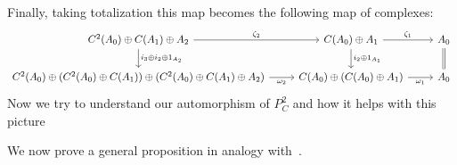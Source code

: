 Finally, taking totalization this map becomes the following map of complexes:
\[\begin{tikzcd}
	{C^2(A_0)\oplus C(A_1)\oplus A_2} & {C(A_0)\oplus A_1} & {A_0} \\
	{C^2(A_0)\oplus (C^2(A_0)\oplus C(A_1))\oplus (C^2(A_0)\oplus C(A_1)\oplus A_2)} & {C(A_0)\oplus (C(A_0)\oplus A_1)} & {A_0}
	\arrow[Rightarrow, no head, from=1-3, to=2-3]
	\arrow["{\zeta_1}", from=1-2, to=1-3]
	\arrow["{\omega_1}"', from=2-2, to=2-3]
	\arrow["{i_2\oplus 1_{A_1}}", from=1-2, to=2-2]
	\arrow["{\omega_2}"', from=2-1, to=2-2]
	\arrow["{\zeta_2}", from=1-1, to=1-2]
	\arrow["{i_3\oplus i_2\oplus 1_{A_2}}", from=1-1, to=2-1]
\end{tikzcd}\]
Now we try to understand our automorphism of $P_C^2$ and how it helps with this picture




We now prove a general proposition in analogy with~\cite[Prop 4.5]{BJORT}.

